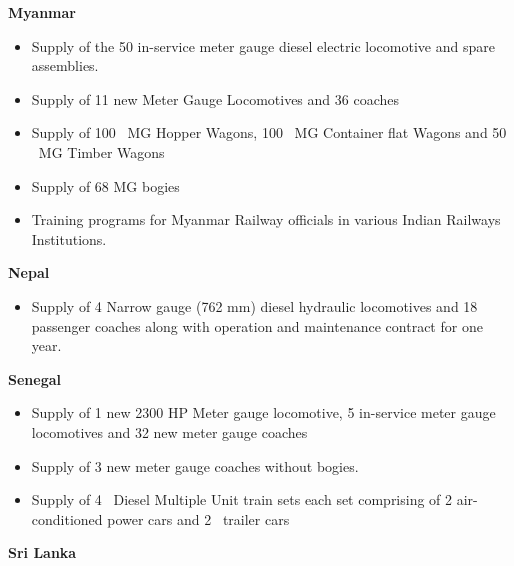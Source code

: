 {\color[rgb]{0.0,0.0,0.039215688}
\textbf{Myanmar}}


\bigskip

\begin{itemize}
\item {\color[rgb]{0.0,0.0,0.039215688}
Supply of the 50 in-service meter gauge diesel electric locomotive and spare assemblies. }
\item {\color[rgb]{0.0,0.0,0.039215688}
Supply of 11 new Meter Gauge Locomotives and 36 coaches}
\item {\color[rgb]{0.0,0.0,0.039215688}
Supply of 100 \ MG Hopper Wagons, 100 \ MG Container flat Wagons and 50 \ MG Timber Wagons}
\item {\color[rgb]{0.0,0.0,0.039215688}
Supply of 68 MG bogies}
\item {\color[rgb]{0.0,0.0,0.039215688}
Training programs for Myanmar Railway officials in various Indian Railways Institutions.}
\end{itemize}

\bigskip

{\color[rgb]{0.0,0.0,0.039215688}
\textbf{Nepal}}


\bigskip

\begin{itemize}
\item {\color[rgb]{0.0,0.0,0.039215688}
Supply of 4 Narrow gauge (762 mm) diesel hydraulic locomotives and 18 passenger coaches along with operation and
maintenance contract for one year. \ }
\end{itemize}

\bigskip

{\color[rgb]{0.0,0.0,0.039215688}
\textbf{Senegal}}


\bigskip

\begin{itemize}
\item {\color[rgb]{0.0,0.0,0.039215688}
Supply of 1 new 2300 HP Meter gauge locomotive, 5 in-service meter gauge locomotives and 32 new meter gauge coaches}
\item {\color[rgb]{0.0,0.0,0.039215688}
Supply of 3 new meter gauge coaches without bogies.}
\item {\color[rgb]{0.0,0.0,0.039215688}
Supply of 4 \ Diesel Multiple Unit train sets each set comprising of 2 air-conditioned power cars and 2 \ trailer cars}
\end{itemize}

\bigskip

{\color[rgb]{0.0,0.0,0.039215688}
\textbf{Sri Lanka}}


